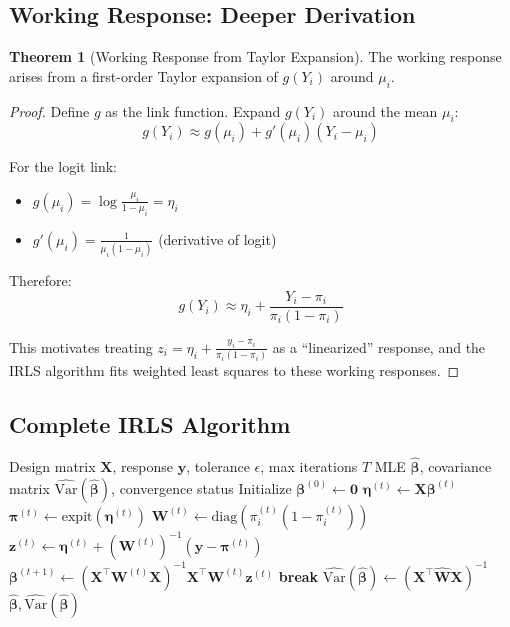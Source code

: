 \documentclass[11pt,letterpaper]{article}
\theoremstyle{definition}
\newtheorem{theorem}{Theorem}[section]
\newcommand{\Var}{\mathrm{Var}}
\newcommand{\X}{\mathbf{X}}
\newcommand{\y}{\mathbf{y}}
\newcommand{\bb}{\boldsymbol{\beta}}
\newcommand{\pp}{\boldsymbol{\pi}}
\newcommand{\ee}{\boldsymbol{\eta}}
\newcommand{\W}{\mathbf{W}}
\newcommand{\diag}{\mathrm{diag}}
\newcommand{\expit}{\mathrm{expit}}
\begin{document}
\subsection{Working Response: Deeper Derivation}

\begin{theorem}[Working Response from Taylor Expansion]
The working response arises from a first-order Taylor expansion of $g(Y_i)$ around $\mu_i$.
\end{theorem}

\begin{proof}
Define $g$ as the link function. Expand $g(Y_i)$ around the mean $\mu_i$:
\begin{equation}
    g(Y_i) \approx g(\mu_i) + g'(\mu_i)(Y_i - \mu_i)
\end{equation}

For the logit link:
\begin{itemize}
    \item $g(\mu_i) = \log\frac{\mu_i}{1-\mu_i} = \eta_i$
    \item $g'(\mu_i) = \frac{1}{\mu_i(1-\mu_i)}$ (derivative of logit)
\end{itemize}

Therefore:
\begin{equation}
    g(Y_i) \approx \eta_i + \frac{Y_i - \pi_i}{\pi_i(1-\pi_i)}
\end{equation}

This motivates treating $z_i = \eta_i + \frac{y_i - \pi_i}{\pi_i(1-\pi_i)}$ as a ``linearized'' response, and the IRLS algorithm fits weighted least squares to these working responses.
\end{proof}

\subsection{Complete IRLS Algorithm}

\begin{algorithm}[H]
\caption{IRLS for Binary Logistic Regression}
\label{alg:irls}
\begin{algorithmic}[1]
\Require Design matrix $\X$, response $\y$, tolerance $\epsilon$, max iterations $T$
\Ensure MLE $\hat{\bb}$, covariance matrix $\widehat{\Var}(\hat{\bb})$, convergence status
\State Initialize $\bb^{(0)} \gets \mathbf{0}$ 
    \State $\ee^{(t)} \gets \X\bb^{(t)}$ 
    \State $\pp^{(t)} \gets \expit(\ee^{(t)})$ 
    \State $\W^{(t)} \gets \diag(\pi_i^{(t)}(1-\pi_i^{(t)}))$ 
    \State $\mathbf{z}^{(t)} \gets \ee^{(t)} + (\W^{(t)})^{-1}(\y - \pp^{(t)})$ 
    \State $\bb^{(t+1)} \gets (\X^\top \W^{(t)} \X)^{-1} \X^\top \W^{(t)} \mathbf{z}^{(t)}$ 
    \If{$\|\bb^{(t+1)} - \bb^{(t)}\|_\infty < \epsilon$}
        \State \textbf{break} 
    \EndIf
\EndFor
\State $\widehat{\Var}(\hat{\bb}) \gets (\X^\top \hat{\W} \X)^{-1}$
\State \Return $\hat{\bb}, \widehat{\Var}(\hat{\bb})$
\end{algorithmic}
\end{algorithm}
\end{document}
